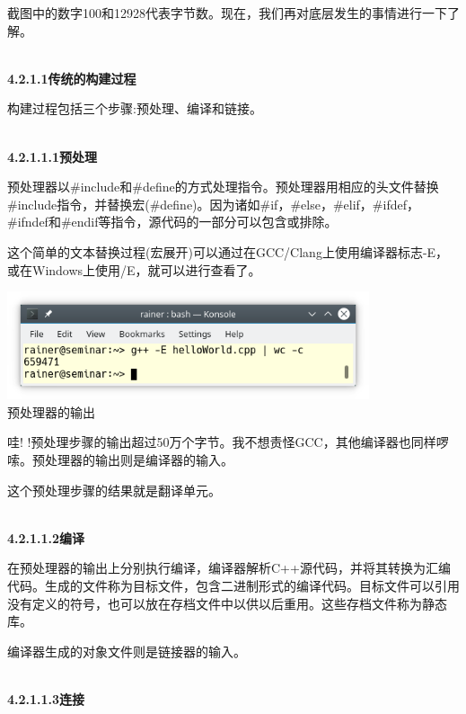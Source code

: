 截图中的数字100和12928代表字节数。现在，我们再对底层发生的事情进行一下了解。

\hspace*{\fill} \\ %
\noindent
\textbf{4.2.1.1\hspace{0.2cm}传统的构建过程}

构建过程包括三个步骤:预处理、编译和链接。

\hspace*{\fill} \\ %
\noindent
\textbf{4.2.1.1.1\hspace{0.2cm}预处理}

预处理器以\#include和\#define的方式处理指令。预处理器用相应的头文件替换\#include指令，并替换宏(\#define)。因为诸如\#if，\#else，\#elif，\#ifdef，\#ifndef和\#endif等指令，源代码的一部分可以包含或排除。

这个简单的文本替换过程(宏展开)可以通过在GCC/Clang上使用编译器标志-E，或在Windows上使用/E，就可以进行查看了。

\begin{center}
\includegraphics[width=0.8\textwidth]{content/3/chapter4/images/13.png}\\
预处理器的输出
\end{center}

哇! !预处理步骤的输出超过50万个字节。我不想责怪GCC，其他编译器也同样啰嗦。预处理器的输出则是编译器的输入。

这个预处理步骤的结果就是翻译单元。

\hspace*{\fill} \\ %
\noindent
\textbf{4.2.1.1.2\hspace{0.2cm}编译}

在预处理器的输出上分别执行编译，编译器解析C++源代码，并将其转换为汇编代码。生成的文件称为目标文件，包含二进制形式的编译代码。目标文件可以引用没有定义的符号，也可以放在存档文件中以供以后重用。这些存档文件称为静态库。

编译器生成的对象文件则是链接器的输入。

\hspace*{\fill} \\ %
\noindent
\textbf{4.2.1.1.3\hspace{0.2cm}连接}


